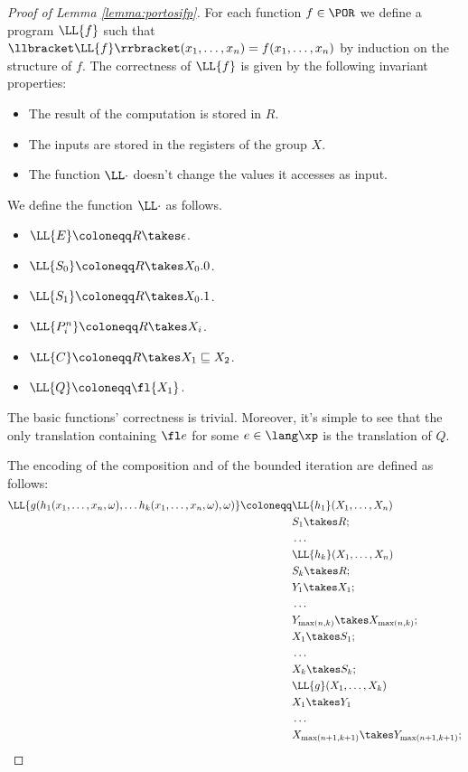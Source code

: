 \begin{proof}[Proof of Lemma \ref{lemma:portosifp}]
For each function $f \in \POR$ we define a program $\LL{f}$ such that
$\llbracket \LL{f}\rrbracket(x_1, \ldots, x_n)=f(x_1, \ldots, x_n)$
by induction on the structure of $f$.
The correctness of $\LL{f}$
is given by the following invariant properties:
\begin{itemize}
\item The result of the computation is stored in $R$.
\item The inputs are stored in the registers of the group $X$.
\item The function $\LL\cdot$ doesn't change the values it accesses as input.
\end{itemize}

We define the function $\LL\cdot$ as follows.
\begin{itemize}
\item $\LL{E}\coloneqq R \takes \epsilon$.
\item $\LL{S_0}\coloneqq R \takes X_0.0$.
\item $\LL{S_1}\coloneqq R \takes X_0.1$.
\item $\LL{{P}^n_i}\coloneqq R \takes X_i$.
\item $\LL{C}\coloneqq R \takes X_1 \sqsubseteq X_2$.
\item $\LL{Q}\coloneqq \fl {X_1}$.
\end{itemize}

The basic functions' correctness is trivial. Moreover, it's simple to see that
the only translation containing $\fl e$ for some $e \in \lang\xp$ is
the translation of $Q$.

The encoding of the composition and of the bounded iteration are defined as follows:
\begin{align*}
\LL{g(h_1(x_1,\ldots, x_n, \omega), \ldots h_k(x_1,\ldots, x_n, \omega), \omega)}\coloneqq&
\LL{h_1}(X_1, \ldots, X_n)\\
&S_1 \takes R;\\
&\ldots\\
&\LL{h_k}(X_1, \ldots, X_n)\\
&S_k \takes R;\\
&Y_1 \takes X_1;\\
& \ldots\\
& Y_{\max(n, k)} \takes X_{\max(n, k)};\\
& X_1 \takes S_1;\\
& \ldots\\
& X_k \takes S_k;\\
&\LL{g}(X_1, \ldots, X_k)\\
& X_1 \takes Y_1\\
&\ldots\\
&X_{\max(n+1, k+1)} \takes Y_{\max(n+1, k+1)};\\
\end{align*}


\end{proof}
